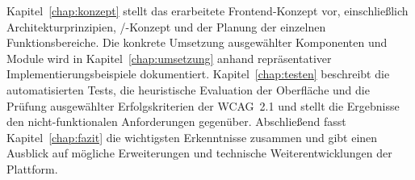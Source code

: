 Kapitel~\ref{chap:konzept} stellt das erarbeitete
Frontend-Konzept vor, einschließlich Architekturprinzipien,
/-Konzept und der Planung der einzelnen Funktionsbereiche.
Die konkrete Umsetzung ausgewählter Komponenten und Module
wird in Kapitel~\ref{chap:umsetzung} anhand repräsentativer
Implementierungsbeispiele dokumentiert. Kapitel~\ref{chap:testen}
beschreibt die automatisierten Tests, die heuristische Evaluation der
Oberfläche und die Prüfung ausgewählter Erfolgskriterien der
\acs{WCAG}~2.1 und stellt die Ergebnisse den nicht-funktionalen
Anforderungen gegenüber.
Abschließend fasst Kapitel~\ref{chap:fazit} die wichtigsten
Erkenntnisse zusammen und gibt einen Ausblick auf mögliche
Erweiterungen und technische Weiterentwicklungen der Plattform.
